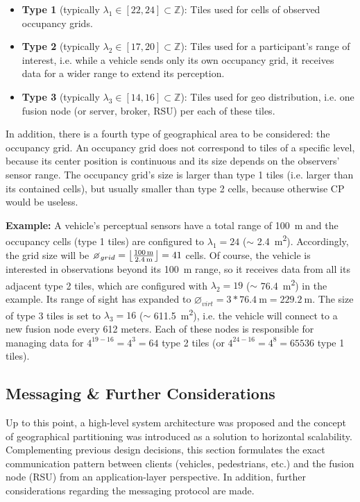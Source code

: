 \begin{itemize}
	\item \textbf{Type 1} (typically $\lambda_1 \in [22, 24] \subset \mathbb{Z}$): Tiles used for cells of observed occupancy grids.
	\item \textbf{Type 2} (typically $\lambda_2 \in [17, 20] \subset \mathbb{Z}$): Tiles used for a participant's range of interest, i.e. while a vehicle sends only its own occupancy grid, it receives data for a wider range to extend its perception.
	\item \textbf{Type 3} (typically $\lambda_3 \in [14, 16] \subset \mathbb{Z}$): Tiles used for geo distribution, i.e. one fusion node (or server, broker, RSU) per each of these tiles.
\end{itemize}

In addition, there is a fourth type of geographical area to be considered: the occupancy grid. An occupancy grid does not correspond to tiles of a specific level, because its center position is continuous and its size depends on the observers' sensor range. The occupancy grid's size is larger than type 1 tiles (i.e. larger than its contained cells), but usually smaller than type 2 cells, because otherwise CP would be useless. 
\par
\bigskip

\textbf{Example:} A vehicle's perceptual sensors have a total range of \SI{100}{\meter} and the occupancy cells (type 1 tiles) are configured to $\lambda_1 = 24$ ($\sim$ \SI{2.4}{\square\meter}). Accordingly, the grid size will be $\diameter_{grid} = \floor*{\frac{\SI{100}{\meter}}{\SI{2.4}{\meter}}} = 41$ cells. Of course, the vehicle is interested in observations beyond its \SI{100}{\meter} range, so it receives data from all its adjacent type 2 tiles, which are configured with $\lambda_2 = 19$ ($\sim$ \SI{76.4}{\square\meter}) in the example. Its range of sight has expanded to $\diameter_{virt} = 3 * \SI{76.4}{\meter} = \SI{229.2}{\meter}$. The size of type 3 tiles is set to $\lambda_3 = 16$ ($\sim$ \SI{611.5}{\square\meter}), i.e. the vehicle will connect to a new fusion node every 612 meters. Each of these nodes is responsible for managing data for $4^{19-16} = 4^3 = 64$ type 2 tiles (or $4^{24-16} = 4^8 = 65536$ type 1 tiles).

\subsection{Messaging \& Further Considerations}
\label{subsec:concept_design:messaging_further_considerations}
Up to this point, a high-level system architecture was proposed and the concept of geographical partitioning was introduced as a solution to horizontal scalability. Complementing previous design decisions, this section formulates the exact communication pattern between clients (vehicles, pedestrians, etc.) and the fusion node (RSU) from an application-layer perspective. In addition, further considerations regarding the messaging protocol are made.
\par
\bigskip

